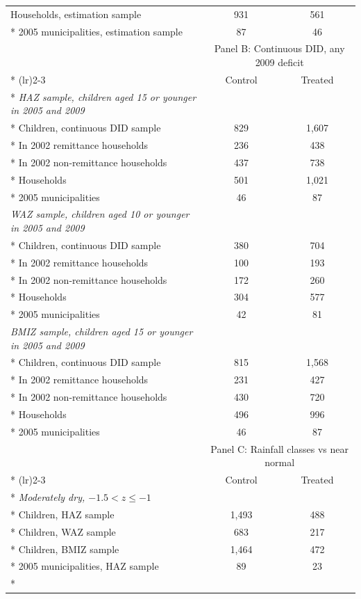 \documentclass[12pt]{article}
\begin{document}
\begin{longtable}{@{\extracolsep{\fill}}lcc}
Households, estimation sample & 931 & 561\\*
2005 municipalities, estimation sample & 87 & 46\\
\bottomrule
\addlinespace[12pt]
\toprule
 & \multicolumn{2}{c}{Panel B: Continuous DID, any 2009 deficit}\\*
\cmidrule(lr){2-3}
 & Control & Treated\\*
\midrule
\textit{HAZ sample, children aged 15 or younger in 2005 and 2009} & & \\*
Children, continuous DID sample & 829 & 1,607\\*
\quad In 2002 remittance households & 236 & 438\\*
\quad In 2002 non-remittance households & 437 & 738\\*
Households & 501 & 1,021\\*
2005 municipalities & 46 & 87\\
\addlinespace[6pt]\textit{WAZ sample, children aged 10 or younger in 2005 and 2009} & & \\*
Children, continuous DID sample & 380 & 704\\*
\quad In 2002 remittance households & 100 & 193\\*
\quad In 2002 non-remittance households & 172 & 260\\*
Households & 304 & 577\\*
2005 municipalities & 42 & 81\\
\addlinespace[6pt]\textit{BMIZ sample, children aged 15 or younger in 2005 and 2009} & & \\*
Children, continuous DID sample & 815 & 1,568\\*
\quad In 2002 remittance households & 231 & 427\\*
\quad In 2002 non-remittance households & 430 & 720\\*
Households & 496 & 996\\*
2005 municipalities & 46 & 87\\
\bottomrule
\newpage
\toprule
 & \multicolumn{2}{c}{Panel C: Rainfall classes vs near normal}\\*
\cmidrule(lr){2-3}
 & Control & Treated\\*
\midrule
\textit{Moderately dry, \ensuremath{-1.5<z\le -1}} & & \\*
Children, HAZ sample & 1,493 & 488\\*
Children, WAZ sample & 683 & 217\\*
Children, BMIZ sample & 1,464 & 472\\*
2005 municipalities, HAZ sample & 89 & 23\\*

\end{longtable}
\end{document}
